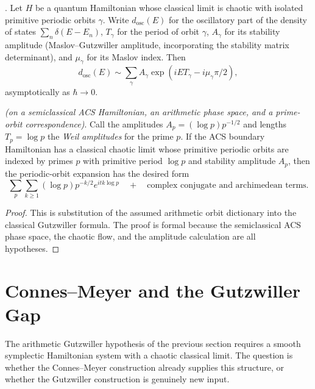 \begin{theorem}
\label{v4-arith:tfe:thm:gutzwiller}
\ClaimStatusProvedElsewhere. Let $H$ be a quantum Hamiltonian whose
classical limit is chaotic with isolated primitive periodic orbits
$\gamma$. Write $d_{\mathrm{osc}}(E)$ for the oscillatory part of the
density of states $\sum_n \delta(E - E_n)$, $T_\gamma$ for the period
of orbit $\gamma$, $A_\gamma$ for its stability amplitude
(Maslov--Gutzwiller amplitude, incorporating the stability matrix
determinant), and $\mu_\gamma$ for its Maslov index. Then
\begin{equation}
\label{v4-arith:tfe:eq:gutzwiller}
d_{\mathrm{osc}}(E)\sim
\sum_\gamma A_\gamma
\exp(iET_\gamma-i\mu_\gamma\pi/2),
\end{equation}
asymptotically as $\hbar \to 0$.
\end{theorem}

\begin{theorem}
\label{v4-arith:tfe:thm:arith-gutzwiller}
\ClaimStatusConditional \emph{(on a semiclassical ACS Hamiltonian,
an arithmetic phase space, and a prime-orbit correspondence)}. Call the
amplitudes \(A_p = (\log p)p^{-1/2}\) and lengths \(T_p = \log p\) the
\emph{Weil amplitudes} for the prime \(p\). If the ACS boundary
Hamiltonian has a classical chaotic limit whose primitive periodic
orbits are indexed by primes \(p\) with primitive period \(\log p\) and
stability amplitude \(A_p\), then the periodic-orbit expansion has the
desired form
\begin{equation}
\label{v4-arith:tfe:eq:arith-gutz}
\sum_p\sum_{k\geq 1}
(\log p)p^{-k/2}e^{itk\log p}
\quad+\quad\text{complex conjugate and archimedean terms}.
\end{equation}
\end{theorem}

\begin{proof}
This is substitution of the assumed arithmetic orbit dictionary into
the classical Gutzwiller formula. The proof is formal because the
semiclassical ACS phase space, the chaotic flow, and the amplitude
calculation are all hypotheses.
\end{proof}

\section{Connes--Meyer and the Gutzwiller Gap}
\label{v4-arith:tfe:connes-obstruction}

The arithmetic Gutzwiller hypothesis of the previous section requires a
smooth symplectic Hamiltonian system with a chaotic classical limit.
The question is whether the Connes--Meyer construction already supplies
this structure, or whether the Gutzwiller construction is genuinely new input.

